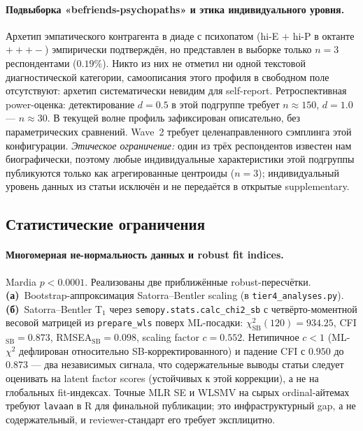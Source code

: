 \paragraph{Подвыборка «befriends-psychopaths» и этика индивидуального уровня.}
\label{subsec:limitations_befriends}
Архетип эмпатического контрагента в диаде с психопатом (hi-E $+$ hi-P в октанте $+++-$) эмпирически подтверждён, но представлен в выборке только $n = 3$ респондентами ($0.19\%$). Никто из них не отметил ни одной текстовой диагностической категории, самоописания этого профиля в свободном поле отсутствуют: архетип систематически невидим для self-report. Ретроспективная power-оценка: детектирование $d = 0.5$ в этой подгруппе требует $n \approx 150$, $d = 1.0$ --- $n \approx 30$. В текущей волне профиль зафиксирован описательно, без параметрических сравнений. Wave~2 требует целенаправленного сэмплинга этой конфигурации. \emph{Этическое ограничение:} один из трёх респондентов известен нам биографически, поэтому любые индивидуальные характеристики этой подгруппы публикуются только как агрегированные центроиды ($n = 3$); индивидуальный уровень данных из статьи исключён и не передаётся в открытые supplementary.

\subsection{Статистические ограничения}

\paragraph{Многомерная не-нормальность данных и robust fit indices.} Mardia $p < 0.0001$. Реализованы две приближённые robust-пересчётки. \textbf{(а)}~Bootstrap-аппроксимация Satorra--Bentler scaling (в \texttt{tier4\_analyses.py}). \textbf{(б)}~Satorra--Bentler T$_1$ через \texttt{semopy.stats.calc\_chi2\_sb} с четвёрто-моментной весовой матрицей из \texttt{prepare\_wls} поверх ML-посадки: $\chi^2_{\mathrm{SB}}(120) = 934.25$, CFI$_{\mathrm{SB}} = 0.873$, RMSEA$_{\mathrm{SB}} = 0.098$, scaling factor $c = 0.552$. Нетипичное $c < 1$ (ML-$\chi^2$ дефлирован относительно SB-корректированного) и падение CFI с $0.950$ до $0.873$ --- два независимых сигнала, что содержательные выводы статьи следует оценивать на latent factor scores (устойчивых к этой коррекции), а не на глобальных fit-индексах. Точные MLR SE и WLSMV на сырых ordinal-айтемах требуют \texttt{lavaan} в R для финальной публикации; это инфраструктурный gap, а не содержательный, и reviewer-стандарт его требует эксплицитно.

